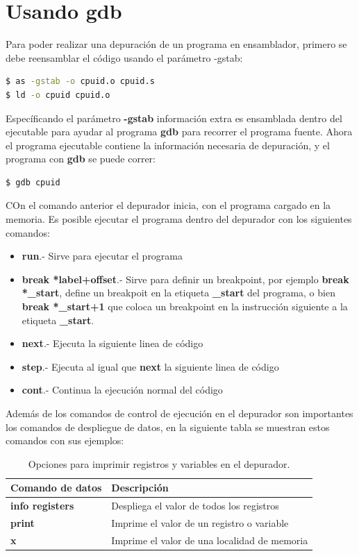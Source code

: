 \documentclass[12pt, twoside]{report}
\begin{document}
\section{Usando gdb}

Para poder realizar una depuración de un programa en ensamblador, primero se debe reensamblar el código usando el parámetro -gstab:

\begin{lstlisting}[language=bash]
$ as -gstab -o cpuid.o cpuid.s
$ ld -o cpuid cpuid.o
\end{lstlisting}

Específicando el parámetro \textbf{-gstab} información extra es ensamblada dentro del ejecutable para ayudar al programa \textbf{gdb} para recorrer el programa fuente. Ahora el programa ejecutable contiene la información necesaria de depuración, y el programa con \textbf{gdb} se puede correr:
\begin{lstlisting}[language=bash]
$ gdb cpuid 
\end{lstlisting}

COn el comando anterior el depurador inicia, con el programa cargado en la memoria. Es posible ejecutar el programa dentro del depurador con los siguientes comandos:

\begin{itemize}
\item \textbf{run}.- Sirve para ejecutar el programa
\item \textbf{break *label+offset}.- Sirve para definir un breakpoint, por ejemplo \textbf{break *\_start}, define un breakpoit en la etiqueta \textbf{\_start} del programa, o bien \textbf{break *\_start+1} que coloca un breakpoint en la instrucción siguiente a la etiqueta \textbf{\_start}.
\item \textbf{next}.- Ejecuta la siguiente linea de código
\item \textbf{step}.- Ejecuta al igual que \textbf{next} la siguiente linea de código
\item \textbf{cont}.- Continua la ejecución normal del código
\end{itemize}

Además de los comandos de control de ejecución en el depurador son importantes los comandos de despliegue de datos, en la siguiente tabla se muestran estos comandos con sus ejemplos:

\begin{table}[htbp]
\begin{center}
\begin{tabular}{|l|l|}
\hline
Comando de datos & Descripción \\
\hline \hline
\textbf{info registers} & Despliega el valor de todos los registros \\ \hline
\textbf{print} & Imprime el valor de un registro o variable  \\ \hline
\textbf{x} & Imprime el valor de una localidad de memoria \\ \hline
\end{tabular}
\caption{Opciones para imprimir registros y variables en el depurador.}
\label{tabla:002}
\end{center}
\end{table}
 
\end{document}
